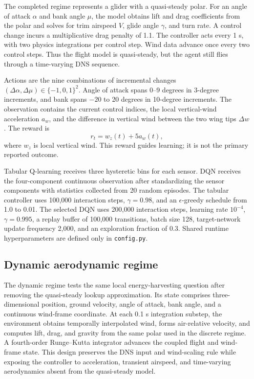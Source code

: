 \documentclass{article}
\begin{document}
The completed regime represents a glider with a quasi-steady polar.  For an
angle of attack $\alpha$ and bank angle $\mu$, the model obtains lift and drag
coefficients from the polar and solves for trim airspeed $V$, glide angle
$\gamma$, and turn rate.  A control change incurs a multiplicative drag penalty
of 1.1.  The controller acts every 1 s, with two physics integrations per
control step.  Wind data advance once every two control steps.  Thus the flight
model is quasi-steady, but the agent still flies through a time-varying DNS
sequence.

Actions are the nine combinations of incremental changes
$(\Delta\alpha,\Delta\mu)\in\{-1,0,1\}^{2}$.  Angle of attack spans
0--9 degrees in 3-degree increments, and bank spans $-20$ to 20 degrees in
10-degree increments.  The observation contains the current control indices,
the local vertical-wind acceleration $a_w$, and the difference in vertical wind
between the two wing tips $\Delta w$.  The reward is
\begin{equation}
  r_t = w_z(t) + 5a_w(t),
\end{equation}
where $w_z$ is local vertical wind.  This reward guides learning; it is not the
primary reported outcome.

Tabular Q-learning receives three hysteretic bins for each sensor.  DQN receives
the four-component continuous observation after standardizing the sensor
components with statistics collected from 20 random episodes.  The tabular
controller uses 100,000 interaction steps, $\gamma=0.98$, and an
$\epsilon$-greedy schedule from 1.0 to 0.01.  The selected DQN uses 200,000
interaction steps, learning rate $10^{-4}$, $\gamma=0.995$, a replay buffer of
100,000 transitions, batch size 128, target-network update frequency 2,000,
and an exploration fraction of 0.3.  Shared runtime hyperparameters are defined
only in \texttt{config.py}.

\subsection{Dynamic aerodynamic regime}
\label{sec:dynamic_environment}

The dynamic regime tests the same local energy-harvesting question after
removing the quasi-steady lookup approximation.  Its state comprises three-
dimensional position, ground velocity, angle of attack, bank angle, and a
continuous wind-frame coordinate.  At each 0.1 s integration substep, the
environment obtains temporally interpolated wind, forms air-relative velocity,
and computes lift, drag, and gravity from the same polar used in the discrete
regime.  A fourth-order Runge--Kutta integrator advances the coupled flight and
wind-frame state.  This design preserves the DNS input and wind-scaling rule
while exposing the controller to acceleration, transient airspeed, and
time-varying aerodynamics absent from the quasi-steady model.
\end{document}
